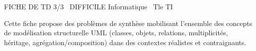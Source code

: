 \documentclass[11pt]{article}
\begin{document}
\begin{tcolorbox}[enhanced,colback=popink,colframe=popink,arc=10pt,boxrule=0pt,left=12pt,right=12pt,top=9pt,bottom=9pt]
{\color{white}\popxbold\small FICHE DE TD 3/3 \textbullet\ DIFFICILE \hfill Informatique \textbullet\ Tle TI\par}
\end{tcolorbox}
\vspace{4pt}
\noindent Cette fiche propose des problèmes de synthèse mobilisant l'ensemble des concepts de modélisation structurelle UML (classes, objets, relations, multiplicités, héritage, agrégation/composition) dans des contextes réalistes et contraignants.
\end{document}
